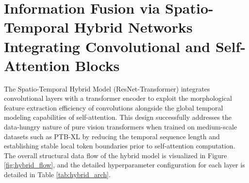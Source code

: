 \documentclass[12pt,a4paper]{report}
\begin{document}
\begin{table}[H]
\caption{1D Vision Transformer (ViT-1D) Architecture Parameters}
\label{tab:vit_arch}
\centering
{}
\end{table}

\clearpage

\section{Information Fusion via Spatio-Temporal Hybrid Networks Integrating Convolutional and Self-Attention Blocks}
The Spatio-Temporal Hybrid Model (ResNet-Transformer) integrates convolutional layers with a transformer encoder to exploit the morphological feature extraction efficiency of convolutions alongside the global temporal modeling capabilities of self-attention. This design successfully addresses the data-hungry nature of pure vision transformers when trained on medium-scale datasets such as PTB-XL by reducing the temporal sequence length and establishing stable local token boundaries prior to self-attention computation. The overall structural data flow of the hybrid model is visualized in Figure \ref{fig:hybrid_flow}, and the detailed hyperparameter configuration for each layer is detailed in Table \ref{tab:hybrid_arch}.
\end{document}
